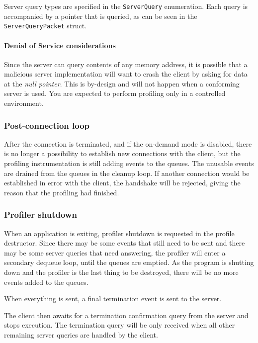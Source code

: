 \documentclass[hidelinks,titlepage,a4paper]{article}
\begin{document}
Server query types are specified in the \texttt{ServerQuery} enumeration. Each query is accompanied by a pointer that is queried, as can be seen in the \texttt{ServerQueryPacket} struct.

\paragraph{Denial of Service considerations}

Since the server can query contents of any memory address, it is possible that a malicious server implementation will want to crash the client by asking for data at the \emph{null pointer}. This is by-design and will not happen when a conforming server is used. You are expected to perform profiling only in a controlled environment.

\subsubsection{Post-connection loop}

After the connection is terminated, and if the on-demand mode is disabled, there is no longer a possibility to establish new connections with the client, but the profiling instrumentation is still adding events to the queues. The unusable events are drained from the queues in the cleanup loop. If another connection would be established in error with the client, the handshake will be rejected, giving the reason that the profiling had finished.

\subsubsection{Profiler shutdown}
\label{shutdown}

When an application is exiting, profiler shutdown is requested in the profile destructor. Since there may be some events that still need to be sent and there may be some server queries that need answering, the profiler will enter a secondary dequeue loop, until the queues are emptied. As the program is shutting down and the profiler is the last thing to be destroyed, there will be no more events added to the queues.

When everything is sent, a final termination event is sent to the server.

The client then awaits for a termination confirmation query from the server and stops execution. The termination query will be only received when all other remaining server queries are handled by the client.
\end{document}
